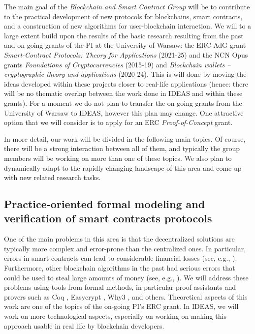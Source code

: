 \documentclass{article}
\begin{document}
The main goal of the \emph{Blockchain and Smart Contract Group} will be to contribute to the practical development of new protocols for blockchains, smart contracts, and a construction of new algorithms for user-blockchain interaction. 
We will to a large extent build upon the results of the basic research resulting from the past and on-going grants of the PI at the University of Warsaw: the ERC AdG grant \emph{Smart-Contract Protocols: Theory for Applications} (2021-25) and the NCN Opus grants \emph{Foundations of Cryptocurrencies} (2015-19) and \emph{Blockchain wallets -- cryptographic theory and applications} (2020-24). This is will done by moving the ideas developed within these projects closer to real-life applications (hence: there will be no thematic overlap between the work done in IDEAS and within these grants). For a moment we do not plan to transfer the on-going grants from the University of Warsaw to IDEAS, however this plan may change. One attractive option that we will consider is to apply for an ERC \emph{Proof-of-Concept} grant.

In more detail, our work will be divided in the following main topics. Of course, there will be a strong interaction between all of them, and typically the group members will be working on more than one of these topics. We also plan to dynamically adapt to the rapidly changing landscape of this area and come up with new related research tasks.




\subsection{Practice-oriented formal modeling and verification of smart contracts protocols}\label{sec:verif}

One of the main problems in this area is that the decentralized solutions are typically more complex and error-prone than the centralized ones. In particular, errors in smart contracts can lead to considerable financial losses (see, e.g., \cite{DAO}). Furthermore, other blockchain algorithms in the past had serious errors that could be used to steal large amounts of money (see, e.g., \cite{HACKETT}).  We will address these problems using tools from formal methods, in particular proof assistants and provers such as Coq \cite{Chlipala2013}, Easycrypt \cite{Barthe2013}, Why3 \cite{Santos2015}, and others. Theoretical aspects of this work are one of the topics of the on-going PI's ERC grant. In IDEAS, we will work on more technological aspects, especially on working on making this approach usable in real life by blockchain developers.
\end{document}
